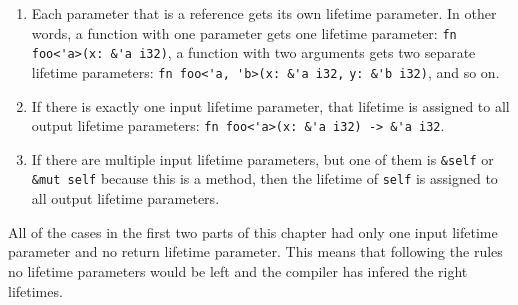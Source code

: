 \begin{enumerate}[noitemsep]
    \item Each parameter that is a reference gets its own lifetime parameter. In other words, a function with one parameter gets one lifetime parameter: \verb|fn foo<'a>(x: &'a i32)|, a function with two arguments gets two separate lifetime parameters: \verb|fn foo<'a, 'b>(x: &'a i32,| \verb|y: &'b i32)|, and so on.
\item If there is exactly one input lifetime parameter, that lifetime is assigned to all output lifetime parameters: \verb|fn foo<'a>(x: &'a i32) -> &'a i32|.
\item If there are multiple input lifetime parameters, but one of them is \verb|&self| or \verb|&mut self| because this is a method, then the lifetime of \verb|self| is assigned to all output lifetime parameters.
\end{enumerate}

All of the cases in the first two parts of this chapter had only one input lifetime parameter and no return lifetime parameter. This means that following the rules no lifetime parameters would be left and the compiler has infered the right lifetimes. 



%    

